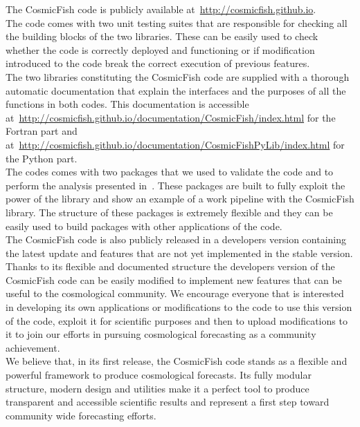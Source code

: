 \documentclass[prd,nofootinbib,showpacs]{revtex4}
\begin{document}
The CosmicFish code is publicly available at~\url{http://cosmicfish.github.io}. \\
%
The code comes with two unit testing suites that are responsible for checking all the building blocks of the two libraries. These can be easily used to check whether the code is correctly deployed and functioning or if modification introduced to the code break the correct execution of previous features. \\
%
The two libraries constituting the CosmicFish code are supplied with a thorough automatic documentation that explain the interfaces and the purposes of all the functions in both codes. This documentation is accessible at~\url{http://cosmicfish.github.io/documentation/CosmicFish/index.html} for the Fortran part and at~\url{http://cosmicfish.github.io/documentation/CosmicFishPyLib/index.html} for the Python part. \\
%
The codes comes with two packages that we used to validate the code and to perform the analysis presented in~\cite{CosmicFishIG}. These packages are built to fully exploit the power of the library and show an example of a work pipeline with the CosmicFish library. The structure of these packages is extremely flexible and they can be easily used to build packages with other applications of the code. \\
%
The CosmicFish code is also publicly released in a developers version containing the latest update and features that are not yet implemented in the stable version.
Thanks to its flexible and documented structure the developers version of the CosmicFish code can be easily modified to implement new features that can be useful to the cosmological community. We encourage everyone that is interested in developing its own applications or modifications to the code to use this version of the code, exploit it for scientific purposes and then to upload modifications to it to join our efforts in pursuing cosmological forecasting as a community achievement. \\
%
We believe that, in its first release, the CosmicFish code stands as a flexible and powerful framework to produce cosmological forecasts. Its fully modular structure, modern design and utilities make it a perfect tool to produce transparent and accessible scientific results and represent a first step toward community wide forecasting efforts.
%
\end{document}
